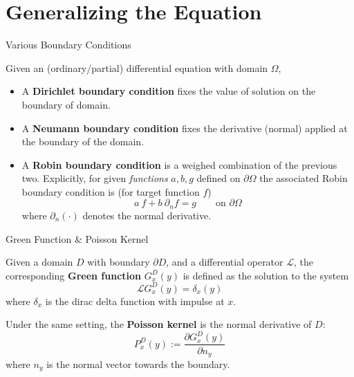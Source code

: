 \documentclass{beamer}
\begin{document}

\section{Generalizing the Equation}

\begin{frame}{Various Boundary Conditions}

	\begin{definition}
		Given an (ordinary/partial) differential equation with domain $\Omega$,
		\begin{itemize}
			\item A \textbf{Dirichlet boundary condition} fixes the value of solution on the boundary of domain. 
			\item A \textbf{Neumann boundary condition} fixes the derivative (normal) applied at the boundary of the domain.
			\item A \textbf{Robin boundary condition} is a weighed combination of the previous two. Explicitly, for given \emph{functions} $a, b, g$ defined on $\partial \Omega$ the associated Robin boundary condition is (for target function $f$)
			\[
				a\ f + b\ \partial_n f = g \qquad \text{on $\partial \Omega$}
			\]
			where $\partial_n(\cdot)$ denotes the normal derivative.
		\end{itemize}
	\end{definition}
	\horzline

\end{frame}

\begin{frame}{Green Function \& Poisson Kernel}

    \begin{definition}
		Given a domain $D$ with boundary $\partial D$, and a differential operator $\mathcal{L}$, the corresponding \textbf{Green function} $G_x^D(y)$ is defined as the solution to the system
		\[
			\mathcal{L} G_x^D(y) = \delta_x(y)
		\]
		where $\delta_x$ is the dirac delta function with impulse at $x$.
	\end{definition}
	\horzline

	\begin{definition}
		Under the same setting, the \textbf{Poisson kernel} is the normal derivative of $D$:
		\[
			P_x^D(y) := \frac{ \partial G_x^D(y) }{\partial n_y}
		\]
		where $n_y$ is the normal vector towards the boundary.
	\end{definition}
	\horzline

\end{frame}
\end{document}
